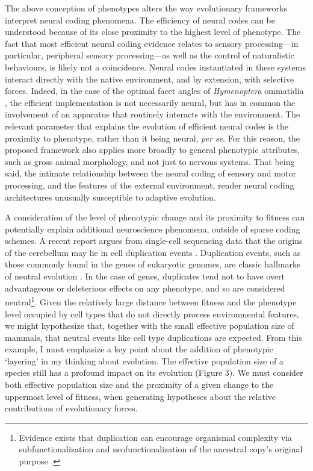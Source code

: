 \documentclass[twocolumn]{article}
\begin{document}
The above conception of phenotypes alters the way evolutionary frameworks interpret neural coding phenomena. The efficiency of neural codes can be understood because of its close proximity to the highest level of phenotype. The fact that most efficient neural coding evidence relates to sensory processing---in particular, peripheral sensory processing---as well as the control of naturalistic behaviours, is likely not a coincidence. Neural codes instantiated in these systems interact directly with the native environment, and by extension, with selective forces. Indeed, in the case of the optimal facet angles of \textit{Hymenoptera} ommatidia \cite{barlow_1952}, the efficient implementation is not necessarily neural, but has in common the involvement of an apparatus that routinely interacts with the environment. The relevant parameter that explains the evolution of efficient neural codes is the proximity to phenotype, rather than it being neural, \textit{per se}. For this reason, the proposed framework also applies more broadly to general phenotypic attributes, such as gross animal morphology, and not just to nervous systems. That being said, the intimate relationship between the neural coding of sensory and motor processing, and the features of the external environment, render neural coding architectures unusually susceptible to adaptive evolution.

A consideration of the level of phenotypic change and its proximity to fitness can potentially explain additional neuroscience phenomena, outside of sparse coding schemes. A recent report argues from single-cell sequencing data that the origins of the cerebellum may lie in cell duplication events \cite{kebschull_luo_2020}. Duplication events, such as those commonly found in the genes of eukaryotic genomes, are classic hallmarks of neutral evolution \cite{Stoltzfus_1999, Lynch_2007, lynch2007origins, wideman_doolittle_2019}. In the case of genes, duplicates tend not to have overt advantageous or deleterious effects on any phenotype, and so are considered neutral\footnote{Evidence exists that duplication can encourage organismal complexity via subfunctionalization and neofunctionalization of the ancestral copy's original purpose \cite{dean_thornton_2007, Lynch_2007}.}. Given the relatively large distance between fitness and the phenotype level occupied by cell types that do not directly process environmental features, we might hypothesize that, together with the small effective population size of mammals, that neutral events like cell type duplications are expected. From this example, I must emphasize a key point about the addition of phenotypic `layering' in my thinking about evolution. The effective population size of a species still has a profound impact on its evolution (Figure 3). We must consider both effective population size and the proximity of a given change to the uppermost level of fitness, when generating hypotheses about the relative contributions of evolutionary forces. 
\end{document}

